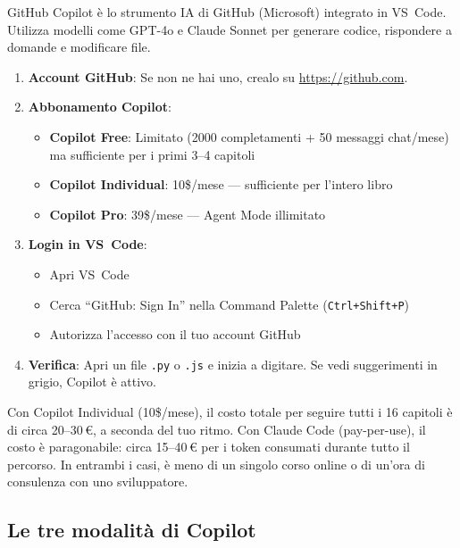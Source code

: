 GitHub Copilot è lo strumento IA di GitHub (Microsoft) integrato in VS~Code. Utilizza modelli come GPT-4o e Claude Sonnet per generare codice, rispondere a domande e modificare file.

\begin{praticabox}[title={Pratica --- Attivazione Copilot}]
\begin{enumerate}
  \item \textbf{Account GitHub}: Se non ne hai uno, crealo su \url{https://github.com}.
  \item \textbf{Abbonamento Copilot}:
    \begin{itemize}
      \item \textbf{Copilot Free}: Limitato (2000 completamenti + 50 messaggi chat/mese) ma sufficiente per i primi 3--4 capitoli
      \item \textbf{Copilot Individual}: 10\$/mese --- sufficiente per l'intero libro
      \item \textbf{Copilot Pro}: 39\$/mese --- Agent Mode illimitato
    \end{itemize}
  \item \textbf{Login in VS~Code}:
    \begin{itemize}
      \item Apri VS~Code
      \item Cerca ``GitHub: Sign In'' nella Command Palette (\texttt{Ctrl+Shift+P})
      \item Autorizza l'accesso con il tuo account GitHub
    \end{itemize}
  \item \textbf{Verifica}: Apri un file \texttt{.py} o \texttt{.js} e inizia a digitare. Se vedi suggerimenti in grigio, Copilot è attivo.
\end{enumerate}
\end{praticabox}

\begin{costbox}
Con Copilot Individual (10\$/mese), il costo totale per seguire tutti i 16 capitoli è di circa 20--30\,\euro, a seconda del tuo ritmo. Con Claude Code (pay-per-use), il costo è paragonabile: circa 15--40\,\euro{} per i token consumati durante tutto il percorso. In entrambi i casi, è meno di un singolo corso online o di un'ora di consulenza con uno sviluppatore.
\end{costbox}

\subsection{Le tre modalità di Copilot}

